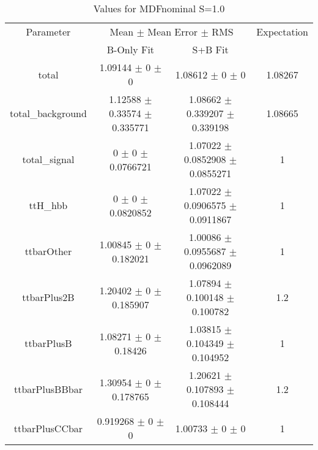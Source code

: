 \begin{table}
\centering
\caption{Values for MDFnominal S=1.0}
\begin{tabular}{cccc}
\toprule
Parameter & \multicolumn{2}{c}{Mean $\pm$ Mean Error $\pm$ RMS} & Expectation\\
 & B-Only Fit & S+B Fit & \\
\midrule
total & \num{1.09144} $\pm$ \num{0} $\pm$ \num{0} & \num{1.08612} $\pm$ \num{0} $\pm$ \num{0} & \num{1.08267}\\
total\_background & \num{1.12588} $\pm$ \num{0.33574} $\pm$ \num{0.335771} & \num{1.08662} $\pm$ \num{0.339207} $\pm$ \num{0.339198} & \num{1.08665}\\
total\_signal & \num{0} $\pm$ \num{0} $\pm$ \num{0.0766721} & \num{1.07022} $\pm$ \num{0.0852908} $\pm$ \num{0.0855271} & \num{1}\\
ttH\_hbb & \num{0} $\pm$ \num{0} $\pm$ \num{0.0820852} & \num{1.07022} $\pm$ \num{0.0906575} $\pm$ \num{0.0911867} & \num{1}\\
ttbarOther & \num{1.00845} $\pm$ \num{0} $\pm$ \num{0.182021} & \num{1.00086} $\pm$ \num{0.0955687} $\pm$ \num{0.0962089} & \num{1}\\
ttbarPlus2B & \num{1.20402} $\pm$ \num{0} $\pm$ \num{0.185907} & \num{1.07894} $\pm$ \num{0.100148} $\pm$ \num{0.100782} & \num{1.2}\\
ttbarPlusB & \num{1.08271} $\pm$ \num{0} $\pm$ \num{0.18426} & \num{1.03815} $\pm$ \num{0.104349} $\pm$ \num{0.104952} & \num{1}\\
ttbarPlusBBbar & \num{1.30954} $\pm$ \num{0} $\pm$ \num{0.178765} & \num{1.20621} $\pm$ \num{0.107893} $\pm$ \num{0.108444} & \num{1.2}\\
ttbarPlusCCbar & \num{0.919268} $\pm$ \num{0} $\pm$ \num{0} & \num{1.00733} $\pm$ \num{0} $\pm$ \num{0} & \num{1}\\
\bottomrule
\end{tabular}
\end{table}